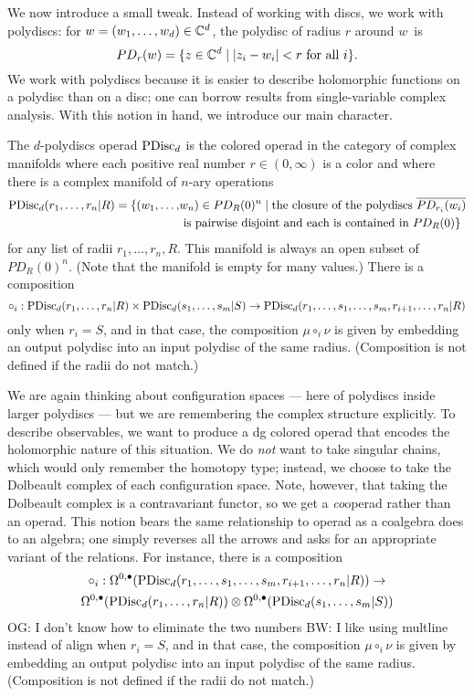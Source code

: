 \documentclass[11pt]{amsart}
\def\brian#1{{\textcolor{blue!75!red}{BW: {#1}}}}
\def\owen#1{{\textcolor{violet!50!black}{OG: {#1}}}}
\begin{document}
We now introduce a small tweak.
Instead of working with discs, we work with polydiscs: for $w = (w_1, \ldots, w_d) \in \mathbb C^d$, the polydisc of radius $r$ around $w$~is
\[
PD_r(w) = \{ z \in \mathbb C^d \;|\; |z_i - w_i| < r \text{ for all $i$}\}.
\]
We work with polydiscs because it is easier to describe holomorphic functions on a polydisc than on a disc;
one can borrow results from single-variable complex analysis.
With this notion in hand, we introduce our main character.

\begin{dfn}
The {$d$-polydiscs operad} ${\rm PDisc}_d$ is the colored operad in the category of complex manifolds where each positive real number $r \in (0,\infty)$ is a color 
and where there is a complex manifold of $n$-ary operations
\begin{align*}
{\rm PDisc}_d(r_1, \ldots, r_n| R) = \{ (w_1, \ldots,& w_n) \in PD_R(0)^n \;|\; 
\text{the closure of the polydiscs $\overline{PD_{r_i}(w_i)}$}\\ 
&\text{ is pairwise disjoint and each is contained in $PD_R(0)$}\}
\end{align*}
for any list of radii $r_1,\ldots, r_n, R$.
This manifold is always an open subset of~$PD_R(0)^n$. 
(Note that the manifold is empty for many values.)
There is a composition
\[
\circ_i: {\rm PDisc}_d(r_1, \ldots, r_n| R) \times {\rm PDisc}_d(s_1, \ldots, s_m| S) \to {\rm PDisc}_d(r_1, \ldots, s_1, \ldots, s_m, r_{i+1}, \ldots, r_n| R)
\]
only when $r_i = S$, 
and in that case, the composition $\mu \circ_i \nu$ is given by embedding an output polydisc into an input polydisc of the same radius.
(Composition is not defined if the radii do not match.)
\end{dfn}

We are again thinking about configuration spaces --- here of polydiscs inside larger polydiscs --- but we are remembering the complex structure explicitly.
To describe observables, we want to produce a dg colored operad that encodes the holomorphic nature of this situation.
We do {\em not} want to take singular chains, which would only remember the homotopy type;
instead, we choose to take the Dolbeault complex of each configuration space.
Note, however, that taking the Dolbeault complex is a contravariant functor,
so we get a {\em co}\/operad rather than an operad.
This notion bears the same relationship to operad as a coalgebra does to an algebra;
one simply reverses all the arrows and asks for an appropriate variant of the relations.
For instance, there is a composition
\begin{multline}
\label{pdcirc}
\circ_i: \Omega^{0,\bullet}({\rm PDisc}_d(r_1, \ldots, s_1, \ldots, s_m, r_{i+1}, \ldots, r_n| R)) \to \\
\Omega^{0,\bullet}({\rm PDisc}_d(r_1, \ldots, r_n| R)) \otimes \Omega^{0,\bullet}({\rm PDisc}_d(s_1, \ldots, s_m| S))
\end{multline}
\owen{I don't know how to eliminate the two numbers}
\brian{I like using multline instead of align}
when $r_i = S$, and in that case, the composition $\mu \circ_i \nu$ is given by embedding an output polydisc into an input polydisc of the same radius.
(Composition is not defined if the radii do not match.)
\end{document}
